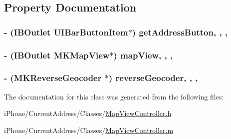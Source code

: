 \subsection{Property Documentation}
\hypertarget{interface_map_view_controller_ad82a4da45ee7fedf7ccf752d8f227de0}{
\subsubsection[{get\-Address\-Button}]{\setlength{\rightskip}{0pt plus 5cm}-\/ (I\-B\-Outlet U\-I\-Bar\-Button\-Item$\ast$) get\-Address\-Button\hspace{0.3cm}{\ttfamily [read]}, {\ttfamily [write]}, {\ttfamily [nonatomic]}, {\ttfamily [retain]}}}\label{interface_map_view_controller_ad82a4da45ee7fedf7ccf752d8f227de0}
\hypertarget{interface_map_view_controller_a250ca1eb6ca5dbeef2c758cfb6c54352}{
\subsubsection[{map\-View}]{\setlength{\rightskip}{0pt plus 5cm}-\/ (I\-B\-Outlet M\-K\-Map\-View$\ast$) map\-View\hspace{0.3cm}{\ttfamily [read]}, {\ttfamily [write]}, {\ttfamily [nonatomic]}, {\ttfamily [retain]}}}\label{interface_map_view_controller_a250ca1eb6ca5dbeef2c758cfb6c54352}
\hypertarget{interface_map_view_controller_a773225e6535bdafdcde9dbc38e648d90}{
\subsubsection[{reverse\-Geocoder}]{\setlength{\rightskip}{0pt plus 5cm}-\/ (M\-K\-Reverse\-Geocoder $\ast$) reverse\-Geocoder\hspace{0.3cm}{\ttfamily [read]}, {\ttfamily [write]}, {\ttfamily [nonatomic]}, {\ttfamily [retain]}}}\label{interface_map_view_controller_a773225e6535bdafdcde9dbc38e648d90}


The documentation for this class was generated from the following files\-:\begin{DoxyCompactItemize}
\item 
i\-Phone/\-Current\-Address/\-Classes/\hyperlink{_map_view_controller_8h}{Map\-View\-Controller.\-h}\item 
i\-Phone/\-Current\-Address/\-Classes/\hyperlink{_map_view_controller_8m}{Map\-View\-Controller.\-m}\end{DoxyCompactItemize}

